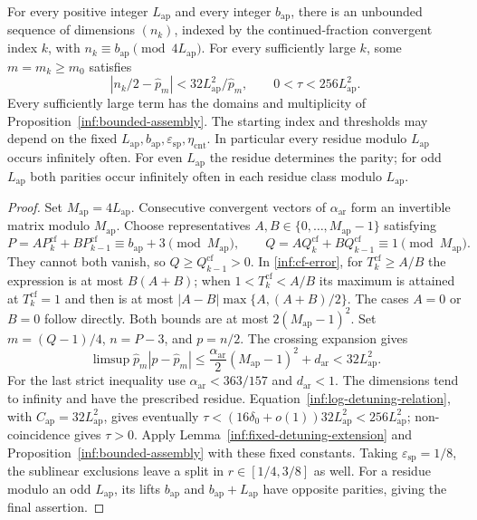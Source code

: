 \begin{theorem}
\label{inf:residue-arithmetic}
For every positive integer $L_{\mathrm{ap}}$ and every integer
$b_{\mathrm{ap}}$, there is an unbounded sequence of dimensions
$(n_k)$, indexed by the continued-fraction convergent index $k$,
with $n_k\equiv b_{\mathrm{ap}}\pmod{4L_{\mathrm{ap}}}$.
For every sufficiently large $k$, some $m=m_k\ge m_0$ satisfies
\[
 |n_k/2-\widehat p_m|<32L_{\mathrm{ap}}^2/\widehat p_m,
 \qquad 0<\tau<256L_{\mathrm{ap}}^2.
\]
Every sufficiently large term has the domains and multiplicity of
Proposition~\ref{inf:bounded-assembly}. The starting index and
thresholds may depend on the fixed
$L_{\mathrm{ap}},b_{\mathrm{ap}},\varepsilon_{\mathrm{sp}},\eta_{\mathrm{cnt}}$.
In particular every residue modulo $L_{\mathrm{ap}}$ occurs
infinitely often. For even $L_{\mathrm{ap}}$ the residue determines
the parity; for odd $L_{\mathrm{ap}}$ both parities occur infinitely
often in each residue class modulo $L_{\mathrm{ap}}$.
\end{theorem}
\begin{proof}
Set $M_{\mathrm{ap}}=4L_{\mathrm{ap}}$. Consecutive convergent vectors
of $\alpha_{\mathrm{ar}}$ form an invertible matrix modulo
$M_{\mathrm{ap}}$. Choose representatives
$A,B\in\{0,\ldots,M_{\mathrm{ap}}-1\}$ satisfying
\[
 P=A P_k^{\mathrm{cf}}+B P_{k-1}^{\mathrm{cf}}
       \equiv b_{\mathrm{ap}}+3\pmod{M_{\mathrm{ap}}},\qquad
 Q=A Q_k^{\mathrm{cf}}+B Q_{k-1}^{\mathrm{cf}}
       \equiv1\pmod{M_{\mathrm{ap}}}.
\]
They cannot both vanish, so $Q\ge Q_{k-1}^{\mathrm{cf}}>0$.
In \eqref{inf:cf-error}, for $T_k^{\mathrm{cf}}\ge A/B$ the expression is at
most $B(A+B)$; when $1<T_k^{\mathrm{cf}}<A/B$ its maximum is attained at
$T_k^{\mathrm{cf}}=1$ and then is at most
$|A-B|\max\{A,(A+B)/2\}$. The cases $A=0$ or $B=0$ follow
directly. Both bounds are at most $2(M_{\mathrm{ap}}-1)^2$.
Set $m=(Q-1)/4$, $n=P-3$, and $p=n/2$. The crossing expansion gives
\[
 \limsup\widehat p_m|p-\widehat p_m|
 \le\frac{\alpha_{\mathrm{ar}}}{2}(M_{\mathrm{ap}}-1)^2
       +d_{\mathrm{ar}}<32L_{\mathrm{ap}}^2.
\]
For the last strict inequality use
$\alpha_{\mathrm{ar}}<363/157$ and $d_{\mathrm{ar}}<1$.
The dimensions tend to infinity and have the prescribed residue.
Equation~\eqref{inf:log-detuning-relation}, with
$C_{\mathrm{ap}}=32L_{\mathrm{ap}}^2$, gives eventually
$\tau<(16\delta_0+o(1))32L_{\mathrm{ap}}^2<256L_{\mathrm{ap}}^2$;
non-coincidence gives $\tau>0$. Apply
Lemma~\ref{inf:fixed-detuning-extension} and
Proposition~\ref{inf:bounded-assembly} with these fixed constants.
Taking $\varepsilon_{\mathrm{sp}}=1/8$, the sublinear exclusions
leave a split in $r\in[1/4,3/8]$ as well.
For a residue modulo an odd $L_{\mathrm{ap}}$, its lifts
$b_{\mathrm{ap}}$ and $b_{\mathrm{ap}}+L_{\mathrm{ap}}$ have opposite
parities, giving the final assertion.
\end{proof}

